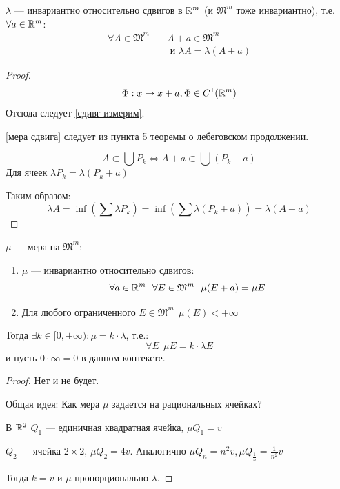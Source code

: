 \begin{corollary}
    \(\lambda\) --- инвариантно относительно сдвигов в \(\mathbb{R}^m\) (и \(\mathfrak{M}^m\) тоже инвариантно), т.е. \(\forall a\in\mathbb{R}^m\):
    \begin{align}
        \forall A\in \mathfrak{M}^m & \quad A + a\in \mathfrak{M}^m \label{сдивг измерим}              \\
                                    & \quad \text{ и } \lambda A = \lambda (A + a) \label{мера сдвига}
    \end{align}
\end{corollary}
\begin{proof}
    \[\Phi : x \mapsto x + a, \Phi\in C^1(\mathbb{R}^m)\]
    Отсюда следует \eqref{сдивг измерим}.

    \eqref{мера сдвига} следует из пункта 5 теоремы о лебеговском продолжении.

    \[A \subset \bigcup P_k \Leftrightarrow A + a \subset \bigcup (P_k + a)\]
    Для ячеек \(\lambda P_k = \lambda(P_k + a)\)

    Таким образом:
    \[\lambda A = \inf \left( \sum \lambda P_k \right) = \inf \left( \sum \lambda (P_k + a) \right) = \lambda (A + a)\]
\end{proof}

\begin{theorem}
    \(\mu\) --- мера на \(\mathfrak{M}^m\):
    \begin{enumerate}
        \item \(\mu\) --- инвариантно относительно сдвигов:
              \[\forall a\in\mathbb{R}^m \ \ \forall E\in \mathfrak{M}^m \ \ \mu(E + a) = \mu E\]
        \item Для любого ограниченного \(E\in \mathfrak{M}^m \ \ \mu(E) < +\infty\)
    \end{enumerate}
    Тогда \(\exists k\in [0, +\infty) : \mu = k\cdot \lambda\), т.е.:
    \[\forall E \ \ \mu E = k \cdot \lambda E\]
    и пусть \(0\cdot \infty = 0\) в данном контексте.
\end{theorem}
\begin{proof}
    Нет и не будет.

    Общая идея: Как мера \(\mu\) задается на рациональных ячейках?

    В \(\mathbb{R}^2\) \(Q_1\) --- единичная квадратная ячейка, \(\mu Q_1 = v\)

    \(Q_2\) --- ячейка \(2 \times 2\), \(\mu Q_2 = 4v\). Аналогично \(\mu Q_n = n^2 v, \mu Q_{\frac{1}{n}} = \frac{1}{n^2}v\)

    Тогда \(k = v\) и \(\mu\) пропорционально \(\lambda\).
\end{proof}

